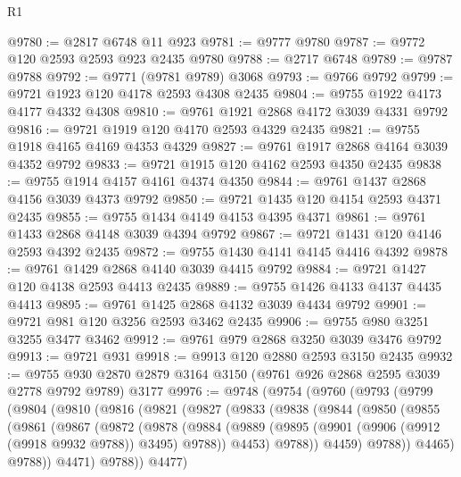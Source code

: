\begin{lexlean}{R1}
\begin{coremodule}
@9780 := @2817 @6748 @11 @923
@9781 := @9777 @9780
@9787 := @9772 @120 @2593 @2593 @923 @2435 @9780
@9788 := @2717 @6748
@9789 := @9787 @9788
@9792 := @9771 (@9781 @9789) @3068
@9793 := @9766 @9792
@9799 := @9721 @1923 @120 @4178 @2593 @4308 @2435
@9804 := @9755 @1922 @4173 @4177 @4332 @4308
@9810 := @9761 @1921 @2868 @4172 @3039 @4331 @9792
@9816 := @9721 @1919 @120 @4170 @2593 @4329 @2435
@9821 := @9755 @1918 @4165 @4169 @4353 @4329
@9827 := @9761 @1917 @2868 @4164 @3039 @4352 @9792
@9833 := @9721 @1915 @120 @4162 @2593 @4350 @2435
@9838 := @9755 @1914 @4157 @4161 @4374 @4350
@9844 := @9761 @1437 @2868 @4156 @3039 @4373 @9792
@9850 := @9721 @1435 @120 @4154 @2593 @4371 @2435
@9855 := @9755 @1434 @4149 @4153 @4395 @4371
@9861 := @9761 @1433 @2868 @4148 @3039 @4394 @9792
@9867 := @9721 @1431 @120 @4146 @2593 @4392 @2435
@9872 := @9755 @1430 @4141 @4145 @4416 @4392
@9878 := @9761 @1429 @2868 @4140 @3039 @4415 @9792
@9884 := @9721 @1427 @120 @4138 @2593 @4413 @2435
@9889 := @9755 @1426 @4133 @4137 @4435 @4413
@9895 := @9761 @1425 @2868 @4132 @3039 @4434 @9792
@9901 := @9721 @981 @120 @3256 @2593 @3462 @2435
@9906 := @9755 @980 @3251 @3255 @3477 @3462
@9912 := @9761 @979 @2868 @3250 @3039 @3476 @9792
@9913 := @9721 @931
@9918 := @9913 @120 @2880 @2593 @3150 @2435
@9932 := @9755 @930 @2870 @2879 @3164 @3150 (@9761 @926 @2868 @2595 @3039 @2778 @9792 @9789) @3177
@9976 := @9748
    (@9754
      (@9760
        (@9793
          (@9799
            (@9804
              (@9810
                (@9816
                  (@9821
                    (@9827
                      (@9833
                        (@9838
                          (@9844
                            (@9850
                              (@9855
                                (@9861
                                  (@9867
                                    (@9872
                                      (@9878
                                        (@9884
                                          (@9889
                                            (@9895
                                              (@9901
                                                (@9906 (@9912 (@9918 @9932 @9788)) @3495)
                                                @9788))
                                            @4453)
                                          @9788))
                                      @4459)
                                    @9788))
                                @4465)
                              @9788))
                          @4471)
                        @9788))
                    @4477)

\end{coremodule}
\end{lexlean}
